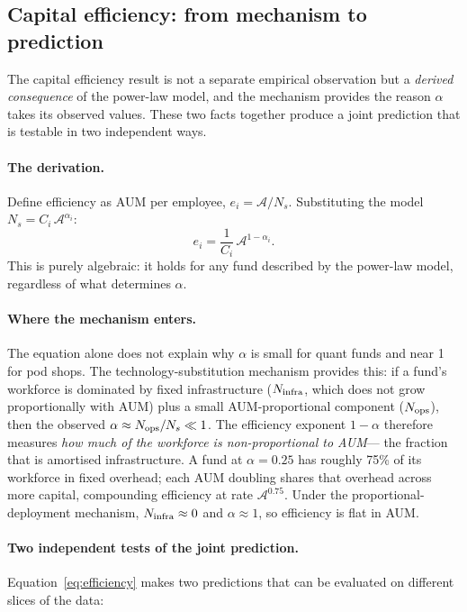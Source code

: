 \documentclass[10pt,onecolumn]{article}
\newcommand{\Ns}{N_{s}}
\newcommand{\Ac}{\mathcal{A}}
\begin{document}
\subsection{Capital efficiency: from mechanism to prediction}
\label{sec:efficiency}

The capital efficiency result is not a separate empirical
observation but a \emph{derived consequence} of the power-law
model, and the mechanism provides the reason $\alpha$ takes its
observed values.
These two facts together produce a joint prediction that is
testable in two independent ways.

\paragraph{The derivation.}
Define efficiency as AUM per employee, $e_i = \Ac/\Ns$.
Substituting the model $\Ns = C_i\,\Ac^{\alpha_i}$:
\begin{equation}
  \label{eq:efficiency}
  e_i = \frac{1}{C_i}\,\Ac^{1-\alpha_i}.
\end{equation}
This is purely algebraic: it holds for any fund described by the
power-law model, regardless of what determines $\alpha$.

\paragraph{Where the mechanism enters.}
The equation alone does not explain why $\alpha$ is small for
quant funds and near 1 for pod shops.
The technology-substitution mechanism provides this:
if a fund's workforce is dominated by fixed infrastructure
($N_{\rm infra}$, which does not grow proportionally with AUM)
plus a small AUM-proportional component ($N_{\rm ops}$),
then the observed $\alpha \approx N_{\rm ops}/N_s \ll 1$.
The efficiency exponent $1 - \alpha$ therefore measures
\emph{how much of the workforce is non-proportional to AUM}---
the fraction that is amortised infrastructure.
A fund at $\alpha = 0.25$ has roughly 75\% of its workforce
in fixed overhead; each AUM doubling shares that overhead across
more capital, compounding efficiency at rate $\Ac^{0.75}$.
Under the proportional-deployment mechanism, $N_{\rm infra} \approx 0$
and $\alpha \approx 1$, so efficiency is flat in AUM.

\paragraph{Two independent tests of the joint prediction.}
Equation~\eqref{eq:efficiency} makes two predictions that can be
evaluated on different slices of the data:
\end{document}
